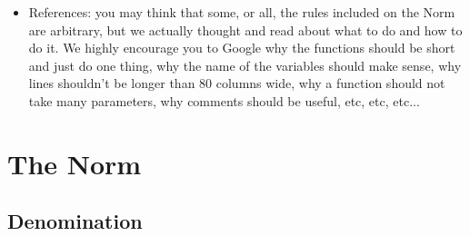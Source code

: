 \documentclass{42-en}
\begin{document}
\begin{itemize}
    \item References: you may think that some, or all, the rules included on the Norm are
      arbitrary, but we actually thought and read about what to do and how to do it. We highly
      encourage you to Google why the functions should be short and just do one thing, why the
      name of the variables should make sense, why lines shouldn't be longer than 80 columns wide,
      why a function should not take many parameters, why comments should be useful, etc, etc, etc...

    \end{itemize}


\newpage

\chapter{The Norm}


    \section{Denomination}
\end{document}
